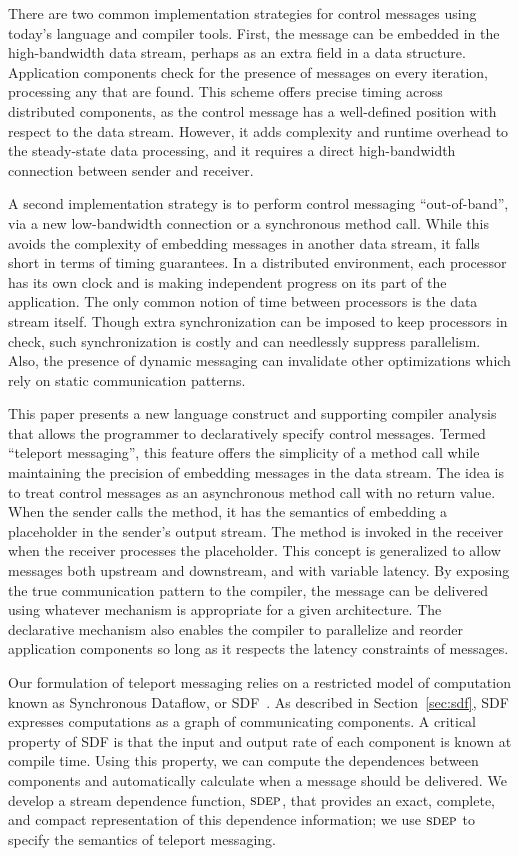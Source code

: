 There are two common implementation strategies for control messages
using today's language and compiler tools.  First, the message can be
embedded in the high-bandwidth data stream, perhaps as an extra field
in a data structure.  Application components check for the presence of
messages on every iteration, processing any that are found.  This
scheme offers precise timing across distributed components, as the
control message has a well-defined position with respect to the data
stream.  However, it adds complexity and runtime overhead to the
steady-state data processing, and it requires a direct high-bandwidth
connection between sender and receiver.

A second implementation strategy is to perform control messaging
``out-of-band'', via a new low-bandwidth connection or a synchronous
method call.  While this avoids the complexity of embedding messages
in another data stream, it falls short in terms of timing guarantees.
In a distributed environment, each processor has its own clock and is
making independent progress on its part of the application.  The only
common notion of time between processors is the data stream itself.
Though extra synchronization can be imposed to keep processors in
check, such synchronization is costly and can needlessly suppress
parallelism.  Also, the presence of dynamic messaging can invalidate
other optimizations which rely on static communication patterns.

This paper presents a new language construct and supporting compiler
analysis that allows the programmer to declaratively specify control
messages.  Termed ``teleport messaging'', this feature offers the
simplicity of a method call while maintaining the precision of
embedding messages in the data stream.  The idea is to treat control
messages as an asynchronous method call with no return value.  When
the sender calls the method, it has the semantics of embedding a
placeholder in the sender's output stream.  The method is invoked in
the receiver when the receiver processes the placeholder.  This
concept is generalized to allow messages both upstream and downstream,
and with variable latency.  By exposing the true communication pattern
to the compiler, the message can be delivered using whatever mechanism
is appropriate for a given architecture.  The declarative mechanism
also enables the compiler to parallelize and reorder application
components so long as it respects the latency constraints of messages.

Our formulation of teleport messaging relies on a restricted model of
computation known as Synchronous Dataflow, or SDF~\cite{LM87-i}.  As
described in Section~\ref{sec:sdf}, SDF expresses computations as a
graph of communicating components.  A critical property of SDF is that
the input and output rate of each component is known at compile time.
Using this property, we can compute the dependences between components
and automatically calculate when a message should be delivered.  We
develop a stream dependence function, $\textsc{sdep}$, that provides an exact,
complete, and compact representation of this dependence information;
we use $\textsc{sdep}$ to specify the semantics of teleport messaging.

